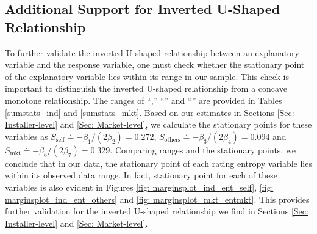 \documentclass[mnsc,blindrev]{informs3}
\begin{document}
	
	
	
	
	\subsection{Additional Support for Inverted U-Shaped Relationship}
	
	To further validate the inverted U-shaped relationship between an explanatory variable and the response variable, one must check whether the stationary point of the explanatory variable lies within its range in our sample. This check is important to distinguish the inverted U-shaped relationship from a concave monotone relationship.  The ranges of ``,'' ``'' and ``'' are provided in Tables \ref{sumstats_ind} and \ref{sumstats_mkt}.
	Based on our estimates in Sections \ref{Sec: Installer-level} and \ref{Sec: Market-level}, we calculate the stationary points for these variables as $S_{\text{self}} \doteq - \beta_{1}/ (2 \beta_{2}) = 0.272$, $S_{\text{others}} \doteq  - \beta_{3}/(2 \beta_{4}) =0.094 $ and $S_{\text{mkt}} \doteq - \beta_{6}/(2 \beta_{7}) =0.329$. Comparing ranges and the stationary points, we conclude that in our data, the stationary point of each rating entropy variable lies within its observed data range. In fact, stationary point for each of these variables is also evident in Figures \ref{fig: marginsplot_ind_ent_self}, \ref{fig: marginsplot_ind_ent_others} and \ref{fig: marginsplot_mkt_entmkt}. This provides further validation for the inverted U-shaped relationship we find in Sections \ref{Sec: Installer-level} and \ref{Sec: Market-level}.
	
\end{document}
